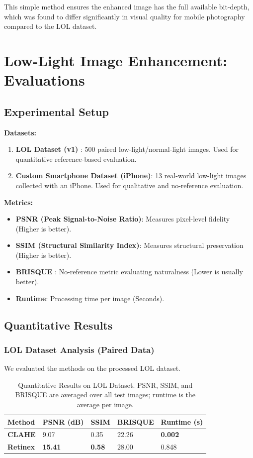 This simple method ensures the enhanced image has the full available bit-depth, which was found to differ significantly in visual quality for mobile photography compared to the LOL dataset.

\section{Low-Light Image Enhancement: Evaluations}

\subsection{Experimental Setup}
\textbf{Datasets:}
\begin{enumerate}
    \item \textbf{LOL Dataset (v1)} \cite{wei2018deep}: 500 paired low-light/normal-light images. Used for quantitative reference-based evaluation.
    \item \textbf{Custom Smartphone Dataset (iPhone)}: 13 real-world low-light images collected with an iPhone. Used for qualitative and no-reference evaluation.
\end{enumerate}

\textbf{Metrics:}
\begin{itemize}
    \item \textbf{PSNR (Peak Signal-to-Noise Ratio)}: Measures pixel-level fidelity (Higher is better).
    \item \textbf{SSIM (Structural Similarity Index)}: Measures structural preservation (Higher is better).
    \item \textbf{BRISQUE} \cite{mittal2012no}: No-reference metric evaluating naturalness (Lower is usually better).
    \item \textbf{Runtime}: Processing time per image (Seconds).
\end{itemize}

\subsection{Quantitative Results}

\subsubsection{LOL Dataset Analysis (Paired Data)}
We evaluated the methods on the processed LOL dataset.

\begin{table}[htbp]
\centering
\begin{tabular}{|l|l|l|l|l|}
\hline
Method & PSNR (dB) & SSIM & BRISQUE & Runtime (s) \\ \hline
\textbf{CLAHE} & 9.07 & 0.35 & 22.26 & \textbf{0.002} \\ \hline
\textbf{Retinex} & \textbf{15.41} & \textbf{0.58} & 28.00 & 0.848 \\ \hline
\end{tabular}
\caption{Quantitative Results on LOL Dataset. PSNR, SSIM, and BRISQUE are averaged over all test images; runtime is the average per image.}
\end{table}

